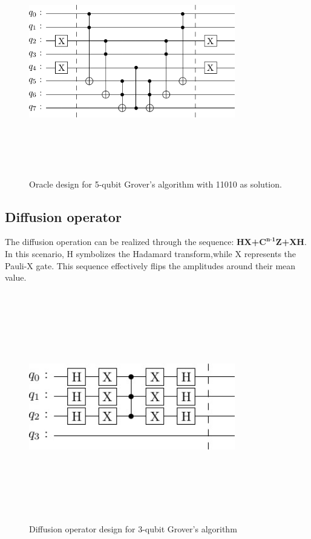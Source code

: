 \documentclass[conference]{IEEEtran}
\begin{document}
\begin{figure}[htbp]
	\centerline{\includegraphics[width=9cm,height=10cm,keepaspectratio]{5-qubit-11010.png}}
	\caption{Oracle design for 5-qubit Grover’s algorithm with 11010 as solution.}
	\label{fig7}
\end{figure}

\subsection{Diffusion operator}
The diffusion operation can be realized through the sequence: \textbf{HX+$\textbf{C}^{\textbf{n-1}}\textbf{Z}$+XH}. In this scenario, H symbolizes
the Hadamard transform,while X represents the Pauli-X gate.
This sequence effectively flips the amplitudes around their
mean value.

\begin{figure}[htbp]
	\centerline{\includegraphics[width=9cm,height=10cm,keepaspectratio]{3-qubit-diff.png}}
	\caption{Diffusion operator design for 3-qubit Grover’s algorithm}
	\label{3diff}
\end{figure}
\end{document}
